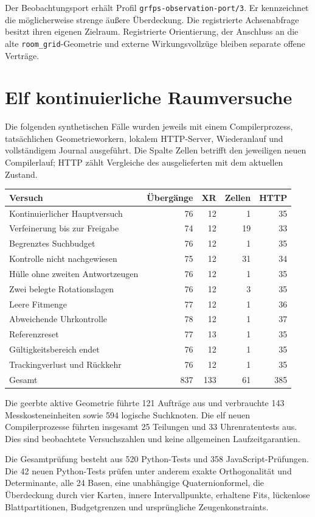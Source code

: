 \documentclass[11pt,a4paper]{article}
\newcommand{\nextsection}[2]{\clearpage{\color{accent}\small\textsf{#1}}\section{#2}}
\begin{document}
Der Beobachtungsport erhält Profil \texttt{grfps-observation-port/3}.
Er kennzeichnet die möglicherweise strenge äußere Überdeckung.
Die registrierte Achsenabfrage besitzt ihren eigenen Zielraum.
Registrierte Orientierung, der Anschluss an die alte
\texttt{room\_grid}-Geometrie und externe Wirkungsvollzüge
bleiben separate offene Verträge.

\nextsection{104 / AUSGEFÜHRTE NACHWEISE}{Elf kontinuierliche Raumversuche}
Die folgenden synthetischen Fälle wurden jeweils mit einem
Compilerprozess, tatsächlichen Geometrieworkern, lokalem
HTTP-Server, Wiederanlauf und vollständigem Journal ausgeführt.
Die Spalte Zellen betrifft den jeweiligen neuen Compilerlauf;
HTTP zählt Vergleiche des ausgelieferten mit dem aktuellen Zustand.

\begin{tabularx}{\linewidth}{@{}Yrrrr@{}}\toprule
Versuch & Übergänge & XR & Zellen & HTTP\\\midrule
Kontinuierlicher Hauptversuch & 76 & 12 & 1 & 35\\
Verfeinerung bis zur Freigabe & 74 & 12 & 19 & 33\\
Begrenztes Suchbudget & 76 & 12 & 1 & 35\\
Kontrolle nicht nachgewiesen & 75 & 12 & 31 & 34\\
Hülle ohne zweiten Antwortzeugen & 76 & 12 & 1 & 35\\
Zwei belegte Rotationslagen & 76 & 12 & 3 & 35\\
Leere Fitmenge & 77 & 12 & 1 & 36\\
Abweichende Uhrkontrolle & 78 & 12 & 1 & 37\\
Referenzreset & 77 & 13 & 1 & 35\\
Gültigkeitsbereich endet & 76 & 12 & 1 & 35\\
Trackingverlust und Rückkehr & 76 & 12 & 1 & 35\\
\midrule
Gesamt & 837 & 133 & 61 & 385\\\bottomrule
\end{tabularx}

Die geerbte aktive Geometrie führte 121 Aufträge aus und
verbrauchte 143 Messkosteneinheiten sowie 594 logische
Suchknoten. Die elf neuen Compilerprozesse führten insgesamt
25 Teilungen und 33 Uhrenratentests aus. Dies sind beobachtete
Versuchszahlen und keine allgemeinen Laufzeitgarantien.

Die Gesamtprüfung besteht aus 520 Python-Tests und 358
JavaScript-Prüfungen. Die 42 neuen Python-Tests prüfen unter
anderem exakte Orthogonalität und Determinante, alle 24 Basen,
eine unabhängige Quaternionformel, die Überdeckung durch vier
Karten, innere Intervallpunkte, erhaltene Fits, lückenlose
Blattpartitionen, Budgetgrenzen und ursprüngliche Zeugenkonstraints.
\end{document}
